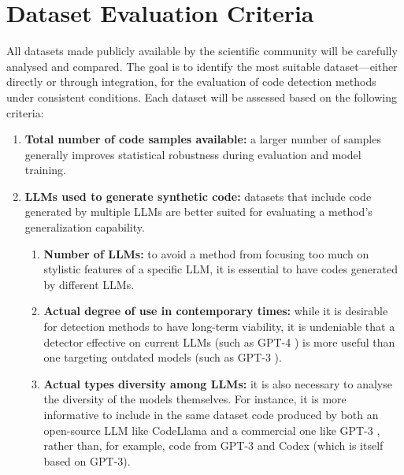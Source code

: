 \section{Dataset Evaluation Criteria}



All datasets made publicly available by the scientific 
community will be carefully analysed and compared. 
The goal is to identify the most suitable dataset—either 
directly or through integration, for the evaluation of code 
detection methods under consistent conditions. Each dataset 
will be assessed based on the following criteria:

\begin{enumerate}
    \item \textbf{Total number of code samples available:} 
    a larger number of samples generally improves statistical 
    robustness during evaluation and model training.
    
    \item \textbf{LLMs used to generate synthetic code:} 
    datasets that include code generated by multiple LLMs are better 
    suited for evaluating a method’s generalization capability.
    \begin{enumerate}
        \item \textbf{Number of LLMs:} 
        to avoid a method from focusing too much on 
        stylistic features of a specific LLM, it is essential 
        to have codes generated by different LLMs.
        \item \textbf{Actual degree of use in contemporary times:}
        while it is desirable for detection methods to have 
        long-term viability, it is undeniable that a detector 
        effective on current LLMs (such as GPT-4 \cite{openai2023gpt4}) is more useful 
        than one targeting outdated models (such as GPT-3 \cite{brown2020language}).
        \item \textbf{Actual types diversity among LLMs:}
        it is also necessary to analyse the diversity of the models 
        themselves. For instance, it is more informative to include 
        in the same dataset code produced by both an open-source LLM 
        like CodeLlama\cite{roziere2023code} 
        and a commercial one like GPT-3 \cite{brown2020language}, rather than, for 
        example, code from GPT-3 \cite{brown2020language} 
        and Codex \cite{chen2021codex} (which is itself based on GPT-3).
    \end{enumerate}
    

\end{enumerate}
